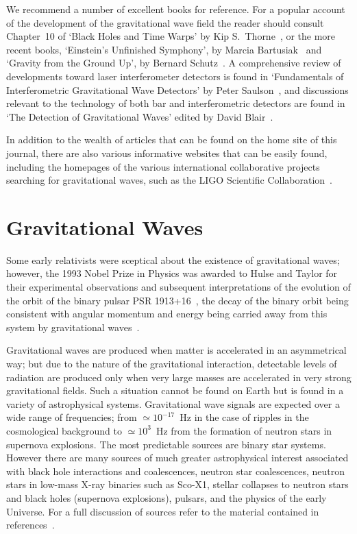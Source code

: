 \documentclass{article}
\begin{document}
We recommend a number of excellent books for reference. For a popular account of the development of the gravitational wave field the reader should consult Chapter~10 of `Black Holes and Time Warps' by Kip S.\ Thorne~\cite{Thorne}, or the more recent books, `Einstein's Unfinished Symphony', by Marcia Bartusiak~\cite{Bartusiak:2003} and `Gravity from the Ground Up', by Bernard Schutz~\cite{Schutz:2003}. A comprehensive review of developments toward laser interferometer detectors is found in `Fundamentals of Interferometric Gravitational Wave Detectors' by Peter Saulson~\cite{Saulsonbook}, and discussions relevant to the technology of both bar and interferometric detectors are found in `The Detection of Gravitational Waves' edited by David Blair~\cite{Blair}.

In addition to the wealth of articles that can be found on the home site of this journal, there are also various informative websites that can be easily found, including the homepages of the various international collaborative projects searching for gravitational waves, such as the LIGO Scientific Collaboration~\cite{LSCweb}.

\newpage


\section{Gravitational Waves}
\label{section:gravwaves}

Some early relativists were sceptical about the existence of gravitational
waves; however, the 1993 Nobel Prize in Physics was awarded to Hulse and Taylor
for their experimental observations and subsequent interpretations of the
evolution of the orbit of the binary pulsar PSR 1913+16~\cite{Hulse, Taylor},
the decay of the binary orbit being consistent with angular momentum and energy
being carried away from this system by gravitational waves~\cite{Will}.

Gravitational waves are produced when matter is accelerated in an asymmetrical
way; but due to the nature of the gravitational interaction, detectable levels
of radiation are produced only when very large masses are accelerated in very
strong gravitational fields. Such a situation cannot be found on Earth but is
found in a variety of astrophysical systems. Gravitational wave signals are
expected over a wide range of frequencies; from $\simeq 10^{-17}$~Hz in the case
of ripples in the cosmological background to $\simeq 10^3$~Hz from the formation
of neutron stars in supernova explosions. The most predictable sources are
binary star systems. However there are many sources of much greater
astrophysical interest associated with black hole interactions and coalescences,
neutron star coalescences, neutron stars in low-mass X-ray binaries such as
Sco-X1, stellar collapses to neutron stars and black holes (supernova
explosions), pulsars, and the physics of the early Universe. For a full
discussion of sources refer to the material contained in
references~\cite{Sathyaprakash:2009,LISAsymposium, sources, Amaldiproc}.
\end{document}
